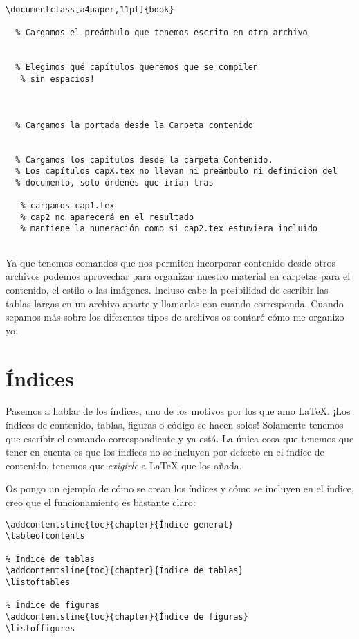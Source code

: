 \begin{lstlisting}[language={[latex]tex}]
\documentclass[a4paper,11pt]{book}

  % Cargamos el preámbulo que tenemos escrito en otro archivo
  

  % Elegimos qué capítulos queremos que se compilen
   % sin espacios!



  % Cargamos la portada desde la Carpeta contenido
  

  % Cargamos los capítulos desde la carpeta Contenido.
  % Los capítulos capX.tex no llevan ni preámbulo ni definición del
  % documento, solo órdenes que irían tras 

   % cargamos cap1.tex
   % cap2 no aparecerá en el resultado
   % mantiene la numeración como si cap2.tex estuviera incluido


\end{lstlisting}

Ya que tenemos comandos que nos permiten incorporar contenido desde
otros archivos podemos aprovechar para organizar nuestro material en
carpetas para el contenido, el estilo o las imágenes. Incluso cabe la
posibilidad de escribir las tablas largas en un archivo aparte y
llamarlas con \lstinline!! cuando corresponda. Cuando sepamos
más sobre los diferentes tipos de archivos os contaré cómo me organizo
yo.

\section{Índices}

Pasemos a hablar de los índices, uno de los motivos por los que amo
LaTeX. ¡Los índices de contenido, tablas, figuras o código se hacen
solos! Solamente tenemos que escribir el comando correspondiente y ya
está. La única cosa que tenemos que tener en cuenta es que los índices
no se incluyen por defecto en el índice de contenido, tenemos que
\emph{exigirle} a LaTeX que los añada.

Os pongo un ejemplo de cómo se crean los índices y cómo se incluyen en
el índice, creo que el funcionamiento es bastante claro:

\begin{lstlisting}[language={[latex]tex}]
% Índice de contenido
\addcontentsline{toc}{chapter}{Índice general}
\tableofcontents

% Índice de tablas
\addcontentsline{toc}{chapter}{Índice de tablas}
\listoftables

% Índice de figuras
\addcontentsline{toc}{chapter}{Índice de figuras}
\listoffigures
\end{lstlisting}

